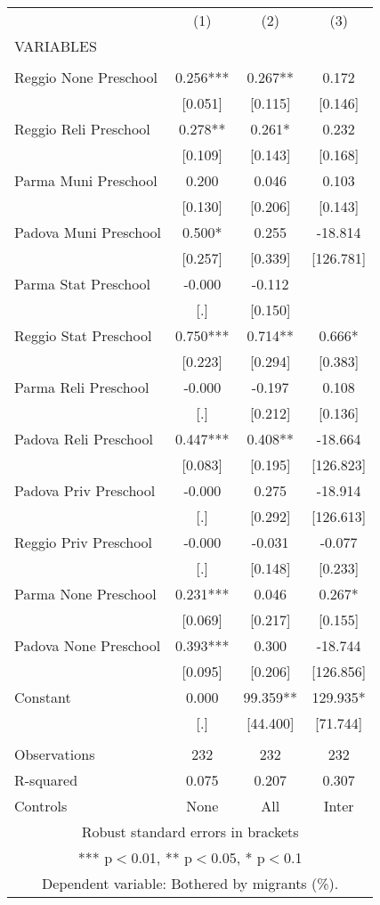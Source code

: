 \begin{tabular}{lccc} \hline
 & (1) & (2) & (3) \\
VARIABLES &  &  &  \\ \hline
 &  &  &  \\
Reggio None Preschool & 0.256*** & 0.267** & 0.172 \\
 & [0.051] & [0.115] & [0.146] \\
Reggio Reli Preschool & 0.278** & 0.261* & 0.232 \\
 & [0.109] & [0.143] & [0.168] \\
Parma Muni Preschool & 0.200 & 0.046 & 0.103 \\
 & [0.130] & [0.206] & [0.143] \\
Padova Muni Preschool & 0.500* & 0.255 & -18.814 \\
 & [0.257] & [0.339] & [126.781] \\
Parma Stat Preschool & -0.000 & -0.112 &  \\
 & [.] & [0.150] &  \\
Reggio Stat Preschool & 0.750*** & 0.714** & 0.666* \\
 & [0.223] & [0.294] & [0.383] \\
Parma Reli Preschool & -0.000 & -0.197 & 0.108 \\
 & [.] & [0.212] & [0.136] \\
Padova Reli Preschool & 0.447*** & 0.408** & -18.664 \\
 & [0.083] & [0.195] & [126.823] \\
Padova Priv Preschool & -0.000 & 0.275 & -18.914 \\
 & [.] & [0.292] & [126.613] \\
Reggio Priv Preschool & -0.000 & -0.031 & -0.077 \\
 & [.] & [0.148] & [0.233] \\
Parma None Preschool & 0.231*** & 0.046 & 0.267* \\
 & [0.069] & [0.217] & [0.155] \\
Padova None Preschool & 0.393*** & 0.300 & -18.744 \\
 & [0.095] & [0.206] & [126.856] \\
Constant & 0.000 & 99.359** & 129.935* \\
 & [.] & [44.400] & [71.744] \\
 &  &  &  \\
Observations & 232 & 232 & 232 \\
R-squared & 0.075 & 0.207 & 0.307 \\
 Controls & None & All & Inter \\ \hline
\multicolumn{4}{c}{ Robust standard errors in brackets} \\
\multicolumn{4}{c}{ *** p$<$0.01, ** p$<$0.05, * p$<$0.1} \\
\multicolumn{4}{c}{ Dependent variable: Bothered by migrants (\%).} \\
\end{tabular}
